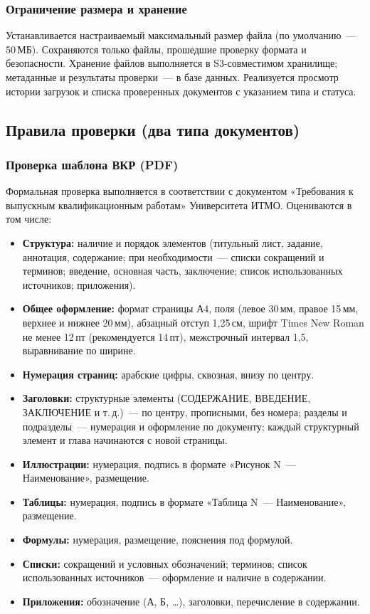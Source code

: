 \subsubsection{Ограничение размера и хранение}
Устанавливается настраиваемый максимальный размер файла (по умолчанию~--- 50\,МБ). Сохраняются только файлы, прошедшие проверку формата и безопасности. Хранение файлов выполняется в S3-совместимом хранилище; метаданные и результаты проверки~--- в базе данных. Реализуется просмотр истории загрузок и списка проверенных документов с указанием типа и статуса.

\subsection{Правила проверки (два типа документов)}

\subsubsection{Проверка шаблона ВКР (PDF)}

Формальная проверка выполняется в соответствии с документом «Требования к выпускным квалификационным работам» Университета ИТМО. Оцениваются в том числе:

\begin{itemize}
  \item \textbf{Структура:} наличие и порядок элементов (титульный лист, задание, аннотация, содержание; при необходимости~--- списки сокращений и терминов; введение, основная часть, заключение; список использованных источников; приложения).
  \item \textbf{Общее оформление:} формат страницы А4, поля (левое 30\,мм, правое 15\,мм, верхнее и нижнее 20\,мм), абзацный отступ 1,25\,см, шрифт Times New Roman не менее 12\,пт (рекомендуется 14\,пт), межстрочный интервал 1,5, выравнивание по ширине.
  \item \textbf{Нумерация страниц:} арабские цифры, сквозная, внизу по центру.
  \item \textbf{Заголовки:} структурные элементы (СОДЕРЖАНИЕ, ВВЕДЕНИЕ, ЗАКЛЮЧЕНИЕ и т.\,д.)~--- по центру, прописными, без номера; разделы и подразделы~--- нумерация и оформление по документу; каждый структурный элемент и глава начинаются с новой страницы.
  \item \textbf{Иллюстрации:} нумерация, подпись в формате «Рисунок N~--- Наименование», размещение.
  \item \textbf{Таблицы:} нумерация, подпись в формате «Таблица N~--- Наименование», размещение.
  \item \textbf{Формулы:} нумерация, размещение, пояснения под формулой.
  \item \textbf{Списки:} сокращений и условных обозначений; терминов; список использованных источников~--- оформление и наличие в содержании.
  \item \textbf{Приложения:} обозначение (А, Б, …), заголовки, перечисление в содержании.
\end{itemize}

